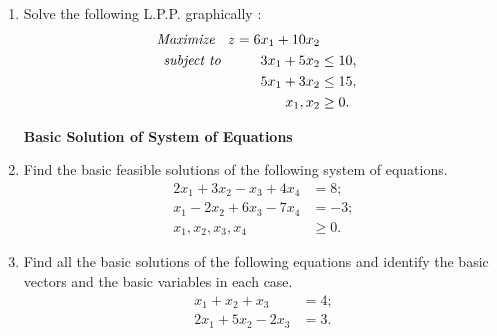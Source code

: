 \documentclass[11pt, a4paper]{article}
\begin{document}
\begin{enumerate}
\vspace{20pt}


\item Solve the following L.P.P. graphically :
	\begin{align*}
\textit{Maximize \hspace{6pt}} z = 6x_1 + 10x_2 \\
\textit{subject to \hspace{25pt}} 3x_1 + 5x_2 &\leq 10, \\
5x_1 + 3x_2 &\leq 15, \\
x_1, x_2 &\geq 0.
	\end{align*}













\newpage

\begin{center}
\textbf{\huge Basic Solution of System of Equations}
\end{center}



\vspace{50pt}





\item Find the basic feasible solutions of the following system of equations.
	\begin{align*}
2x_1 + 3x_2 - x_3 + 4x_4 &= 8; \\
x_1 - 2x_2 + 6x_3 - 7x_4 &= -3; \\
x_1, x_2, x_3, x_4 &\geq 0.	
	\end{align*}
	

\vspace{30pt}



	
\item Find all the basic solutions of the following equations and identify the basic vectors and the basic variables in each case.
	\begin{align*}
x_1 + x_2 + x_3 &= 4; \\
2x_1 + 5x_2 - 2x_3 &= 3.	
	\end{align*}
	








\end{enumerate}
\end{document}
